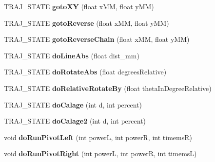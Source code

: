 \begin{DoxyCompactItemize}
\item 
\mbox{\label{classAsserv_a3208aa1d2cc84eff11770477b79aa6f7}} 
T\+R\+A\+J\+\_\+\+S\+T\+A\+TE {\bfseries goto\+XY} (float x\+MM, float y\+MM)
\item 
\mbox{\label{classAsserv_ade31f4182c755e3ee09092fe9bf3d5d0}} 
T\+R\+A\+J\+\_\+\+S\+T\+A\+TE {\bfseries goto\+Reverse} (float x\+MM, float y\+MM)
\item 
\mbox{\label{classAsserv_af02450d4e92f864b844a63ffe6fb16d3}} 
T\+R\+A\+J\+\_\+\+S\+T\+A\+TE {\bfseries goto\+Reverse\+Chain} (float x\+MM, float y\+MM)
\item 
\mbox{\label{classAsserv_a470496b8e6a0ef4cf0063c9b013aff35}} 
T\+R\+A\+J\+\_\+\+S\+T\+A\+TE {\bfseries do\+Line\+Abs} (float dist\+\_\+mm)
\item 
\mbox{\label{classAsserv_a2e7e67323efc1850803fea827614e8dc}} 
T\+R\+A\+J\+\_\+\+S\+T\+A\+TE {\bfseries do\+Rotate\+Abs} (float degrees\+Relative)
\item 
\mbox{\label{classAsserv_ab4983829a4592b28165f2fc3924572bd}} 
T\+R\+A\+J\+\_\+\+S\+T\+A\+TE {\bfseries do\+Relative\+Rotate\+By} (float theta\+In\+Degree\+Relative)
\item 
\mbox{\label{classAsserv_a0ac23995bdebb69bb49304850c951886}} 
T\+R\+A\+J\+\_\+\+S\+T\+A\+TE {\bfseries do\+Calage} (int d, int percent)
\item 
\mbox{\label{classAsserv_acc891ab26e32320b4f2fac646de93632}} 
T\+R\+A\+J\+\_\+\+S\+T\+A\+TE {\bfseries do\+Calage2} (int d, int percent)
\item 
\mbox{\label{classAsserv_a3468d8efb89878c2235dc491c6e7a541}} 
void {\bfseries do\+Run\+Pivot\+Left} (int powerL, int powerR, int timemsR)
\item 
\mbox{\label{classAsserv_a79a9b2ee1d39046119673dc81733bdab}} 
void {\bfseries do\+Run\+Pivot\+Right} (int powerL, int powerR, int timemsL)
\item 
\mbox{\label{classAsserv_ae746b06ee24e29a511dc3c6f022ac35f}} 

\end{DoxyCompactItemize}
